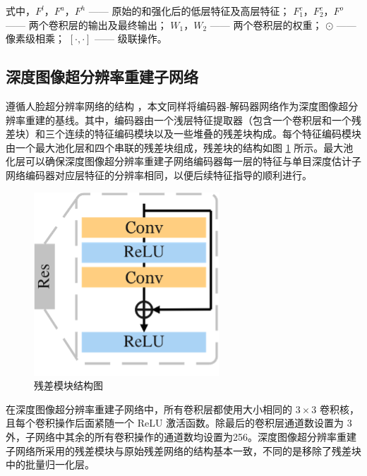 \noindent 式中，$F^l$，$F^a$，$F^h$ —— 原始的和强化后的低层特征及高层特征；\newline
 \indent\quad $F_1^c$，$F_2^c$，$F^o$ —— 两个卷积层的输出及最终输出；\newline
 \indent\quad $W_1$，$W_2$ —— 两个卷积层的权重；\newline
 \indent\quad $\odot$ —— 像素级相乘；\newline
 \indent\quad $[·,·]$ —— 级联操作。
 
 \newpage
 
 \subsection{深度图像超分辨率重建子网络}
 
 遵循人脸超分辨率网络的结构 \cite{DBLP:conf/aaai/YinRZF20}，本文同样将编码器-解码器网络作为深度图像超分辨率重建的基线。其中，编码器由一个浅层特征提取器（包含一个卷积层和一个残差块）和三个连续的特征编码模块以及一些堆叠的残差块构成。每个特征编码模块由一个最大池化层和四个串联的残差块组成，残差块的结构如图 \ref{fig:fig3-3} 所示。最大池化层可以确保深度图像超分辨率重建子网络编码器每一层的特征与单目深度估计子网络编码器对应层特征的分辨率相同，以便后续特征指导的顺利进行。

\begin{figure}[!htbp]
	\centering
	\includegraphics{figures/19.png}
	\caption{残差模块结构图}
	\label{fig:fig3-3}
	\vspace{-0.8cm}  %
\end{figure}

在深度图像超分辨率重建子网络中，所有卷积层都使用大小相同的 $3 \times 3$ 卷积核，且每个卷积操作后面紧随一个 ReLU 激活函数。除最后的卷积层通道数设置为 3 外，子网络中其余的所有卷积操作的通道数均设置为256。深度图像超分辨率重建子网络所采用的残差模块与原始残差网络的结构基本一致，不同的是移除了残差块中的批量归一化层。

